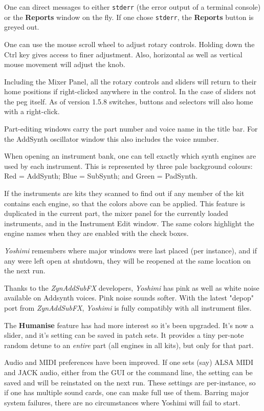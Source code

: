 \documentclass[
 11pt,
 twoside,
 a4paper,
 final                                 %
]{article}
\begin{document}
   One can direct messages to either \texttt{stderr}
   (the error output of a terminal console) or the \textbf{Reports} window
   on the fly. If one chose \texttt{stderr}, the \textbf{Reports} button is
   greyed out.

   One can use the mouse scroll wheel to adjust rotary controls. Holding
   down the Ctrl key gives access to finer adjustment.  Also, horizontal as
   well as vertical mouse movement will adjust the knob.

   Including the Mixer Panel, all the rotary controls and sliders will return
   to their home positions if right-clicked anywhere in the control. In the case
   of sliders not the peg itself. As of version 1.5.8 switches, buttons and
   selectors will also home with a right-click.

   Part-editing windows carry the part number and voice name in the title bar.
   For the AddSynth oscillator window this also includes the voice number.

   When opening an instrument bank, one can tell exactly which synth
   engines are used by each instrument. This is represented by three pale
   background colours: Red = AddSynth; Blue = SubSynth; and Green = PadSynth.

   If the instruments are kits they scanned to find out if any member of the
   kit contains each engine, so that the colors above can be applied.
   This feature is duplicated in the current part, the mixer panel for the
   currently loaded instruments, and in the Instrument Edit window.
   The same colors highlight the engine names when they are enabled with the
   check boxes.

   \textsl{Yoshimi} remembers where major windows were last placed (per
   instance), and if any were left open at shutdown, they will be reopened at
   the same location on the next run.

   Thanks to the \textsl{ZynAddSubFX} developers, \textsl{Yoshimi} has pink
   as well as white noise available on Addsynth voices. Pink noise sounds
   softer.  With the latest "depop" port from \textsl{ZynAddSubFX},
   \textsl{Yoshimi} is fully compatibly with all instrument files.

   The \textbf{Humanise} feature has had more interest so it's been upgraded.
   It's now a slider, and it's setting can be saved in patch sets. It provides
   a tiny per-note random detune to an \textsl{entire} part (all engines in all
   kits), but only for that part.

   Audio and MIDI preferences have been improved. If one sets (say) ALSA MIDI
   and JACK audio, either from the GUI or the command line, the setting can be
   saved and will be reinstated on the next run. These settings are
   per-instance, so if one has multiple sound cards, one can make full use of
   them.  Barring major system failures, there are no circumstances where
   Yoshimi will fail to start.
\end{document}
